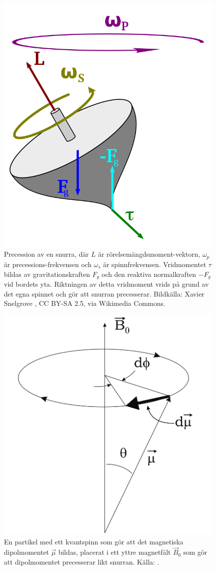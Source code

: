 \documentclass[11pt, a4paper]{article}
\begin{document}
\begin{figure}[p]
	\centering
	\includegraphics[width=.5\textwidth]{snurra_precession}
	\caption{Precession av en snurra, där $L$ är rörelsemängdsmoment-vektorn, $\omega_p$ är precessions-frekvensen och $\omega_s$ är spinnfrekvensen. Vridmomentet $\tau$ bildas av gravitationskraften $F_g$ och den reaktiva normalkraften $-F_g$ vid bordets yta. Riktningen av detta vridmoment vrids på grund av det egna spinnet och gör att snurran precesserar. Bildkälla: Xavier Snelgrove \parencite*{fig:snurra_precession}, CC BY-SA 2.5, via Wikimedia Commons.}
	\label{fig:snurra_precession}
\end{figure}
\begin{figure}[p]
	\centering
	\includegraphics[width=.5\textwidth]{magnetic_moment_precession}
	\caption{En partikel med ett kvantspinn som gör att det magnetiska dipolmomentet $\vec\mu$ bildas, placerat i ett yttre magnetfält $\vec B_0$ som gör att dipolmomentet precesserar likt snurran. Källa: \cite{mri_lärobok}.}
	\label{fig:magnetiskt_moment_precession}
\end{figure}
\end{document}

